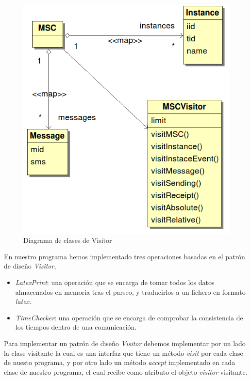 \begin{figure}
  \centering 
  \includegraphics[scale=0.5]{./images/diag_visitor.png}
  \caption{Diagrama de clases de Visitor}
  \label{fig:diagvisitor}
\end{figure}


En nuestro programa hemos implementado tres operaciones basadas en el
patrón de diseño \textit{Visitor},
\begin{itemize}
\item \textit{LatexPrint}: una operación que se encarga de tomar todos
  los datos almacenados en memoria tras el parseo, y traducirlos a un
  fichero en formato \textit{latex}.
\item \textit{TimeChecker}: una operación que se encarga de comprobar
  la consistencia de los tiempos dentro de una comunicación. 
\end{itemize}

Para implementar un patrón de diseño \textit{Visitor} debemos
implementar por un lado la clase visitante la cual es una interfaz que
tiene un método \textit{visit} por cada clase de nuesto programa, y
por otro lado un método \textit{accept} implementado en cada clase de
nuestro programa, el cual recibe como atributo el objeto
\textit{visitor} visitante.

